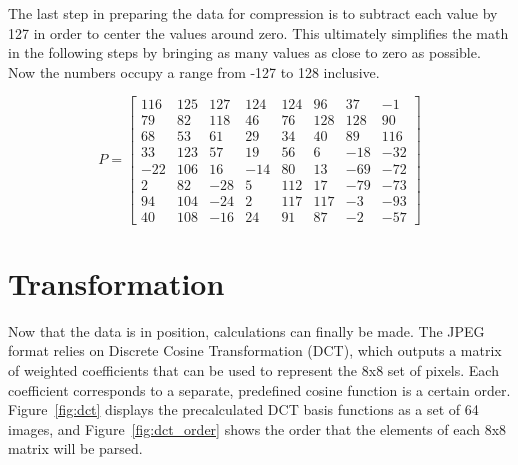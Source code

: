 \documentclass[11pt]{article}
\begin{document}
The last step in preparing the data for compression is to subtract each value by 127 in order to center the values around zero.
This ultimately simplifies the math in the following steps by bringing as many values as close to zero as possible.
Now the numbers occupy a range from -127 to 128 inclusive.

\begin{equation}
  \label{eqn:centered}
  P = \begin{bmatrix}
    116 & 125 & 127 & 124 & 124 & 96  & 37  & -1  \\
    79  & 82  & 118 & 46  & 76  & 128 & 128 & 90  \\
    68  & 53  & 61  & 29  & 34  & 40  & 89  & 116 \\
    33  & 123 & 57  & 19  & 56  & 6   & -18 & -32 \\
    -22 & 106 & 16  & -14 & 80  & 13  & -69 & -72 \\
    2   & 82  & -28 & 5   & 112 & 17  & -79 & -73 \\
    94  & 104 & -24 & 2   & 117 & 117 & -3  & -93 \\
    40  & 108 & -16 & 24  & 91  & 87  & -2  & -57
  \end{bmatrix}
\end{equation}

\section{Transformation}
\label{sec: transformation}

Now that the data is in position, calculations can finally be made.
The JPEG format relies on Discrete Cosine Transformation (DCT), which outputs a matrix of weighted coefficients that can be used to represent the 8x8 set of pixels.
Each coefficient corresponds to a separate, predefined cosine function is a certain order.
Figure~\ref{fig:dct} displays the precalculated DCT basis functions as a set of 64 images, and Figure~\ref{fig:dct_order} shows the order that the elements of each 8x8 matrix will be parsed.
\end{document}
